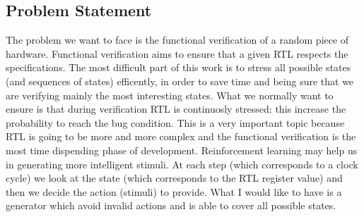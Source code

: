\documentclass{article}
\begin{document}
\subsection{Problem Statement}
% 
% 
The problem we want to face is the functional verification of a random piece of hardware. Functional verification aims to ensure that a given RTL respects the specifications. The most difficult part of this work is to stress all possible states (and sequences of states) efficently, in order to save time and being sure that we are verifying mainly the most interesting states. What we normally want to ensure is that during verification RTL is continuosly stressed: this increase the probability to reach the bug condition. This is a very important topic because RTL is going to be more and more complex and the functional verification is the most time dispending phase of development. Reinforcement learning may help us in generating more intelligent stimuli. At each step (which corresponds to a clock cycle) we look at the state (which corresponds to the RTL register value) and then we decide the action (stimuli) to provide. What I would like to have is a generator which avoid invalid actions and is able to cover all possible states. 
\end{document}
